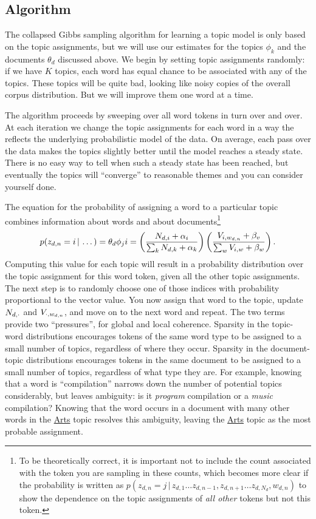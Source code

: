 \subsection{Algorithm}

The collapsed Gibbs sampling algorithm for learning a topic model is
only based on the topic assignments, but we will use our estimates for
the topics $\phi_k$ and the documents $\theta_d$ discussed above.  We
begin by setting topic assignments randomly: if we have $K$ topics,
each word has equal chance to be associated with any of the topics.
These topics will be quite bad, looking like noisy copies of the
overall corpus distribution. But we will improve them one word at a
time.

The algorithm proceeds by sweeping over all word tokens in turn over and over.
At each iteration we change the topic assignments for each word in a way the reflects the
underlying probabilistic model of the data.  On average, each pass over the data makes the
topics slightly better until the model reaches a steady state.  There is no easy way
to tell when such a steady state has been reached, but eventually the
topics will ``converge'' to reasonable themes and you can consider yourself done.

The equation for the probability of assigning a word to a particular topic
combines information about words and about documents\footnote{To be theoretically correct, it is important
not to include the count associated with the token you are sampling in
these counts, which becomes more clear if the probability is written as
$p(z_{d,n}=j\,|\,z_{d,1}\dots z_{d,n-1},z_{d,n+1}\dots z_{d,N_d}, w_{d,n})$ to
show the dependence on the topic assignments of \emph{all other} tokens but not
this token.}
\begin{align}
p(z_{d,n}=i \, | \, \dots) = \theta_d
\phi_ji= \left(\frac{N_{d,i} + \alpha_i}{\sum_k N_{d,k} + \alpha_k} \right) \left( \frac{V_{i,w_{d,n}} + \beta_v}{\sum_w V_{i,w} +
    \beta_w} \right).
\label{eq:sampling}
\end{align}
Computing this value for each topic will result in a probability distribution over the topic assignment for this word token, given all the other topic assignments.  The next step is to randomly choose one of those indices with
probability proportional to the vector value.  You now assign that word to the
topic, update $N_{d,\cdot}$ and $V_{\cdot,w_{d,n}}$, and move on to the next word and repeat.
The two terms provide two ``pressures'', for global and local coherence. Sparsity in the topic-word distributions encourages tokens of the same word type to be assigned to a small number of topics,  regardless of where they occur. Sparsity in the document-topic distributions encourages tokens in the same document to be assigned to a small number of topics, regardless of what type they are.
For example, knowing that a word is ``compilation'' narrows down the
number of potential topics considerably, but leaves ambiguity: is it
\emph{program} compilation or a \emph{music} compilation? Knowing that the word occurs in a document with many other words in the \underline{Arts} topic resolves this ambiguity, leaving the \underline{Arts} topic as the most probable assignment.

